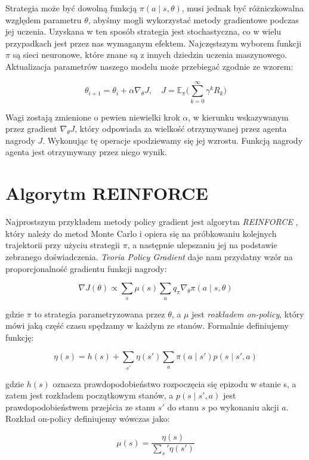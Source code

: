 \documentclass[licencjacka]{pracamgr}
\begin{document}
Strategia może być dowolną funkcją $\pi(a \mid s, \theta)$, musi jednak być różniczkowalna względem parametru $\theta$, abyśmy mogli wykorzystać metody gradientowe podczas jej uczenia. Uzyskana w ten sposób strategia jest stochastyczna, co w wielu przypadkach jest przez nas wymaganym efektem. Najczęstszym wyborem funkcji $\pi$ są sieci neuronowe, które znane są z innych dziedzin uczenia maszynowego. Aktualizacja parametrów naszego modelu może przebiegać zgodnie ze wzorem:

$$ \theta_{i+1} = \theta_i + \alpha \nabla_{\theta}J , \quad
J = \mathbb{E}_{\pi} \Big( \sum_{k = 0}^{\infty} \gamma^k R_k \Big)
$$

Wagi zostają zmienione o pewien niewielki krok $\alpha$, w kierunku wskazywanym przez gradient $ \nabla_{\theta}J $, który odpowiada za wielkość otrzymywanej przez agenta nagrody $ J $. Wykonując tę operacje spodziewamy się jej wzrostu. Funkcją nagrody agenta jest otrzymywany przez niego wynik.

\section{Algorytm REINFORCE}

Najprostszym przykładem metody policy gradient jest algorytm \emph{REINFORCE} \cite{reinforce}, który należy do metod Monte Carlo i opiera się na próbkowaniu kolejnych trajektorii przy użyciu strategii $\pi$, a następnie ulepszaniu jej na podstawie zebranego doświadczenia. \emph{Teoria Policy Gradient} daje nam przydatny wzór na proporcjonalność gradientu funkcji nagrody:

\begin{equation}\label{eq:pgt}
\nabla J(\theta) \propto \sum_s \mu(s) \sum_a q_{\pi} \nabla_{\theta} \pi(a \mid s, \theta)
\end{equation}

gdzie $\pi$ to strategia parametryzowana przez $\theta$, a $\mu$ jest \emph{rozkładem on-policy}, który mówi jaką część czasu spędzamy w każdym ze stanów. Formalnie definiujemy funkcję:

$$ \eta(s) = h(s) + \sum_{s'} \eta(s') \sum_{a} \pi(a \mid s') p(s \mid s', a) $$

gdzie $ h(s) $ oznacza prawdopodobieństwo rozpoczęcia się epizodu w stanie s, a zatem jest rozkładem początkowym stanów, a $p(s \mid s', a) $ jest prawdopodobieństwem przejścia ze stanu $s'$ do stanu $s$ po wykonaniu akcji $a$. Rozkład on-policy definiujemy wówczas jako:

$$ \mu (s) = \frac{\eta(s)}{\sum_s' \eta(s')} $$
\end{document}
